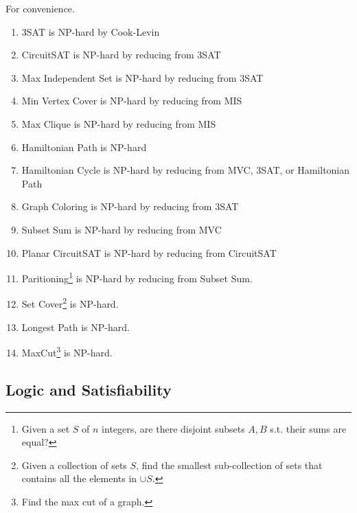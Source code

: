 \documentclass{article}
\begin{document}
    \begin{theorem}
      For convenience. 
      \begin{enumerate}
        \item 3SAT is NP-hard by Cook-Levin 
        \item CircuitSAT is NP-hard by reducing from 3SAT 
        \item Max Independent Set is NP-hard by reducing from 3SAT 
        \item Min Vertex Cover is NP-hard by reducing from MIS 
        \item Max Clique is NP-hard by reducing from MIS \label{max-clique-np-hard}
        \item Hamiltonian Path is NP-hard 
        \item Hamiltonian Cycle is NP-hard by reducing from MVC, 3SAT, or Hamiltonian Path 
        \item Graph Coloring is NP-hard by reducing from 3SAT 
        \item Subset Sum is NP-hard by reducing from MVC 
        \item Planar CircuitSAT is NP-hard by reducing from CircuitSAT 
        \item Paritioning\footnote{Given a set $S$ of $n$ integers, are there disjoint subsets $A, B$ s.t. their sums are equal?} is NP-hard by reducing from Subset Sum. 
        \item Set Cover\footnote{Given a collection of sets $S$, find the smallest sub-collection of sets that contains all the elements in $\cup S$.} is NP-hard. 
        \item Longest Path is NP-hard. 
        \item MaxCut\footnote{Find the max cut of a graph.} is NP-hard. 
      \end{enumerate}
    \end{theorem}

  \subsection{Logic and Satisfiability}
  
\end{document}
